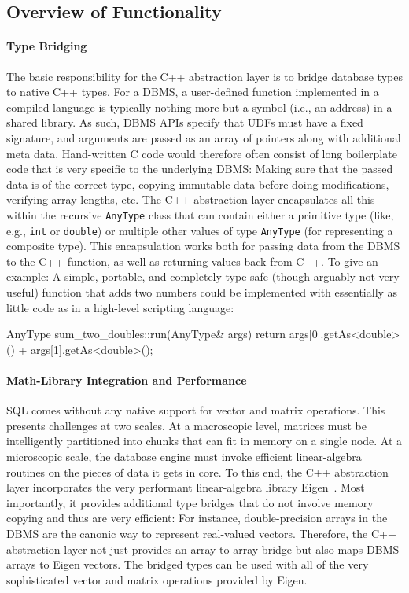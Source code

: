 \subsection{Overview of Functionality} \label{sec:C++AL:Classes}

\paragraph{Type Bridging}

The basic responsibility for the C++ abstraction layer is to bridge database types to native C++ types. For a DBMS, a user-defined function implemented in a compiled language is typically nothing more but a symbol (i.e., an address) in a shared library. As such, DBMS APIs specify that UDFs must have a fixed signature, and arguments are passed as an array of pointers along with additional meta data. Hand-written C code would therefore often consist of long boilerplate code that is very specific to the underlying DBMS: Making sure that the passed data is of the correct type, copying immutable data before doing modifications, verifying array lengths, etc. The C++ abstraction layer encapsulates all this within the recursive \texttt{AnyType} class that can contain either a primitive type (like, e.g., \texttt{int} or \texttt{double}) or multiple other values of type \texttt{AnyType} (for representing a composite type). This encapsulation works both for passing data from the DBMS to the C++ function, as well as returning values back from C++. To give an example: A simple, portable, and completely type-safe (though arguably not very useful) function that adds two numbers could be implemented with essentially as little code as in a high-level scripting language:
\begin{cpp}
    AnyType
    sum_two_doubles::run(AnyType& args) {
        return args[0].getAs<double>()
             + args[1].getAs<double>();
    }
\end{cpp}

\paragraph{Math-Library Integration and Performance}

SQL comes without any native support for vector and matrix operations. This presents challenges at two scales. At a macroscopic level, matrices must be intelligently partitioned into chunks that can fit in memory on a single node. At a microscopic scale, the database engine must invoke efficient linear-algebra routines on the pieces of data it gets in core. To this end, the C++ abstraction layer incorporates the very performant linear-algebra library Eigen~\cite{eigen}. Most importantly, it provides additional type bridges that do not involve memory copying and thus are very efficient: For instance, double-precision arrays in the DBMS are the canonic way to represent real-valued vectors. Therefore, the C++ abstraction layer not just provides an array-to-array bridge but also maps DBMS arrays to Eigen vectors. The bridged types can be used with all of the very sophisticated vector and matrix operations provided by Eigen.

